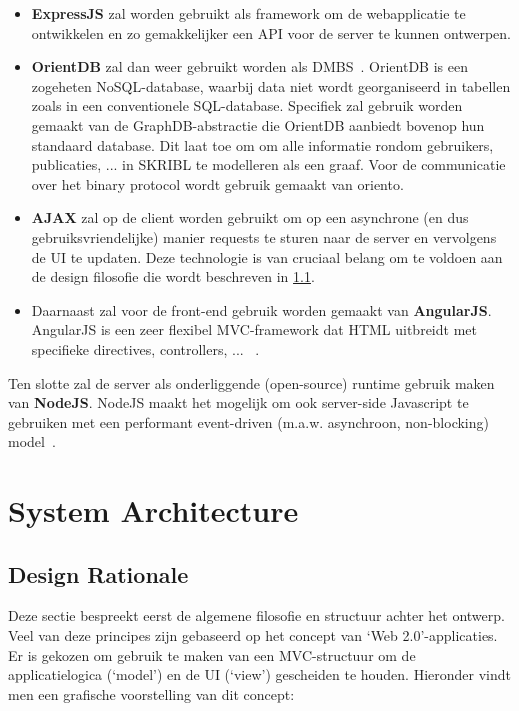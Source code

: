 \documentclass{article}
\begin{document}
\begin{itemize}

\item \textbf{ExpressJS} zal worden gebruikt als framework om de webapplicatie te ontwikkelen en zo gemakkelijker een API voor de server te kunnen ontwerpen\cite{website:ExpressJS}. 

\item \textbf{OrientDB} zal dan weer gebruikt worden als DMBS~\cite{website:OrientDB}. OrientDB is een zogeheten NoSQL-database, waarbij data niet wordt georganiseerd in tabellen zoals in een conventionele SQL-database. Specifiek zal gebruik worden gemaakt van de GraphDB-abstractie die OrientDB aanbiedt bovenop hun standaard database. 
Dit laat toe om om alle informatie rondom gebruikers, publicaties, ... in SKRIBL te modelleren als een graaf. Voor de communicatie over het binary protocol wordt gebruik gemaakt van oriento.~\cite{website:Oriento}

\item \textbf{AJAX} zal op de client worden gebruikt om op een asynchrone (en dus gebruiksvriendelijke) manier requests te sturen naar de server en vervolgens de UI te updaten. Deze technologie is van cruciaal belang om te voldoen aan de design filosofie die wordt beschreven in \ref{sec:rationale}.

\item Daarnaast zal voor de front-end gebruik worden gemaakt van \textbf{AngularJS}. AngularJS  is een zeer flexibel MVC-framework dat HTML uitbreidt met specifieke directives, controllers, ... ~\cite{website:AngularJS}. 
\end{itemize}

Ten slotte zal de server als onderliggende (open-source) runtime gebruik maken van \textbf{NodeJS}. NodeJS maakt het mogelijk om ook server-side Javascript te gebruiken met een performant event-driven (m.a.w. asynchroon, non-blocking) model~\cite{website:NodeJS}. 
\clearpage

\section{System Architecture}

\subsection{Design Rationale}
\label{sec:rationale}

Deze sectie bespreekt eerst de algemene filosofie en structuur achter het ontwerp. Veel van deze principes zijn gebaseerd op het concept van `Web 2.0'-applicaties.
Er is gekozen om gebruik te maken van een MVC-structuur om de applicatielogica (`model') en de UI (`view') gescheiden te houden. 
Hieronder vindt men een grafische voorstelling van dit concept:
\end{document}
